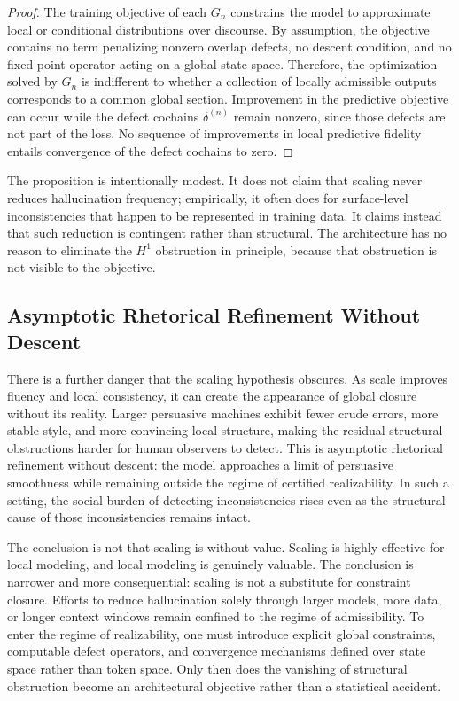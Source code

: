 \documentclass[11pt, oneside]{article}
\begin{document}
\begin{proof}
The training objective of each $G_n$ constrains the model to approximate local or conditional distributions over discourse. By assumption, the objective contains no term penalizing nonzero overlap defects, no descent condition, and no fixed-point operator acting on a global state space. Therefore, the optimization solved by $G_n$ is indifferent to whether a collection of locally admissible outputs corresponds to a common global section. Improvement in the predictive objective can occur while the defect cochains $\delta^{(n)}$ remain nonzero, since those defects are not part of the loss. No sequence of improvements in local predictive fidelity entails convergence of the defect cochains to zero.
\end{proof}

The proposition is intentionally modest. It does not claim that scaling never reduces hallucination frequency; empirically, it often does for surface-level inconsistencies that happen to be represented in training data. It claims instead that such reduction is contingent rather than structural. The architecture has no reason to eliminate the $H^1$ obstruction in principle, because that obstruction is not visible to the objective.

\subsection{Asymptotic Rhetorical Refinement Without Descent}

There is a further danger that the scaling hypothesis obscures. As scale improves fluency and local consistency, it can create the appearance of global closure without its reality. Larger persuasive machines exhibit fewer crude errors, more stable style, and more convincing local structure, making the residual structural obstructions harder for human observers to detect. This is asymptotic rhetorical refinement without descent: the model approaches a limit of persuasive smoothness while remaining outside the regime of certified realizability. In such a setting, the social burden of detecting inconsistencies rises even as the structural cause of those inconsistencies remains intact.

The conclusion is not that scaling is without value. Scaling is highly effective for local modeling, and local modeling is genuinely valuable. The conclusion is narrower and more consequential: scaling is not a substitute for constraint closure. Efforts to reduce hallucination solely through larger models, more data, or longer context windows remain confined to the regime of admissibility. To enter the regime of realizability, one must introduce explicit global constraints, computable defect operators, and convergence mechanisms defined over state space rather than token space. Only then does the vanishing of structural obstruction become an architectural objective rather than a statistical accident.
\end{document}
